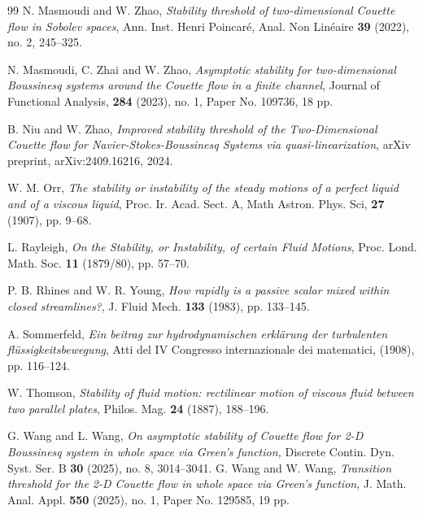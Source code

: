 \documentclass[reqno, 12pt]{amsart} %
\theoremstyle{plain} %
\theoremstyle{definition}
\theoremstyle{remark}
\numberwithin{equation}{section} %
\begin{document}
\begin{thebibliography}{99}
		N. Masmoudi and W. Zhao, 
		\textit{Stability threshold of two-dimensional Couette flow in Sobolev spaces}, 
		Ann. Inst. Henri Poincaré, Anal. Non Linéaire \textbf{39} (2022), no. 2, 245–325.
		
		N. Masmoudi, C. Zhai and W. Zhao, 
		\textit{Asymptotic stability for two-dimensional Boussinesq systems around the Couette flow in a finite channel}, 
		Journal of Functional Analysis, \textbf{284} (2023), no. 1, Paper No. 109736, 18 pp.
		
		B. Niu and W. Zhao, 
		\textit{Improved stability threshold of the Two-Dimensional Couette flow for Navier-Stokes-Boussinesq Systems via quasi-linearization}, arXiv preprint, 
		arXiv:2409.16216, 2024.
		
		W. M. Orr, 
		\textit{The stability or instability of the steady motions of a perfect liquid and of a viscous liquid}, 
		Proc. Ir. Acad. Sect. A, Math Astron. Phys. Sci, \textbf{27} (1907), pp. 9–68.
		
		L. Rayleigh, 
		\textit{On the Stability, or Instability, of certain Fluid Motions}, 
		Proc. Lond. Math. Soc. \textbf{11} (1879/80), pp. 57–70.
		
		P. B. Rhines and W. R. Young, 
		\textit{How rapidly is a passive scalar mixed within closed streamlines?}, 
		J. Fluid Mech. \textbf{133} (1983), pp. 133–145.
		
		A. Sommerfeld, 
		\textit{Ein beitrag zur hydrodynamischen erklärung der turbulenten flüssigkeitsbewegung}, 
		Atti del IV Congresso internazionale dei matematici, (1908), pp. 116–124.
		
		W. Thomson, 
		\textit{Stability of fluid motion: rectilinear motion of viscous fluid between two parallel plates}, 
		Philos. Mag. \textbf{24} (1887), 188–196.
		
		  G. Wang and L. Wang, \textit{On asymptotic stability of Couette flow for 2-D Boussinesq system in whole space via Green's function,} Discrete Contin. Dyn. Syst. Ser. B \textbf{30} (2025), no. 8, 3014–3041.
		G. Wang and W. Wang, 
		\textit{Transition threshold for the 2-D Couette flow in whole space via Green's function}, 
		J. Math. Anal. Appl. \textbf{550} (2025), no. 1, Paper No. 129585, 19 pp.
		

\end{thebibliography}
\end{document}
